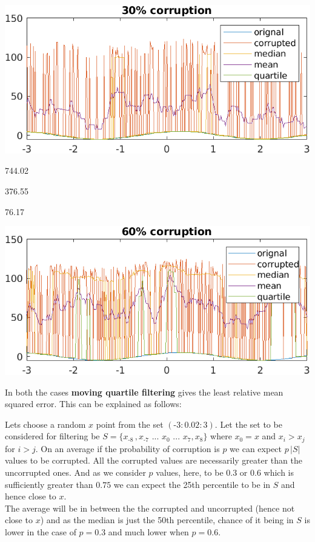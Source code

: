 \documentclass{article}
\theoremstyle{remark}
\begin{document}
\begin{center}
    \includegraphics{q6(1).png}
\end{center}

\begin{description}[noitemsep]
    \item [Moving Median Filtering]\hspace{0.1em} 744.02
    \item [Moving Average Filtering]\hspace{0.2em} 376.55
    \item [Moving Quartile Filtering]  76.17
\end{description}

\begin{center}
    \includegraphics{q6(2).png}
\end{center}
In both the cases \textbf{moving quartile filtering} gives the least relative mean squared error. This can be explained as follows:\par
Lets choose a random $x$ point from the set $(\text{-}3:0.02:3)$. Let the set to be considered for filtering be $S = \{x_{\text{-}8}\,,x_{\text{-}7}\,\,...\,\, x_{0}\,\, ...\,\, x_{7},x_{8}\}$ where $x_0=x$ and $x_i>x_j$ for $i>j$. On an average if the probability of corruption is $p$ we can expect $p\,|S|$ values to be corrupted. All the corrupted values are necessarily greater than the uncorrupted ones. And as we consider $p$ values, here, to be $0.3$ or $0.6$ which is sufficiently greater than $0.75$ we can expect the 25th percentile to be in $S$ and hence close to $x$. \\
The average will be in between the the corrupted and uncorrupted (hence not close to $x$) and as the median is just the 50th percentile, chance of it being in $S$ is lower in the case of $p=0.3$ and much lower when $p=0.6$.
\end{document}

